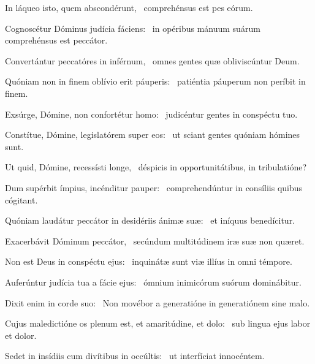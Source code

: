 \item In láqueo isto, quem abscondérunt,~\psstar{} comprehénsus est pes eórum.

\item Cognoscétur Dóminus judícia fáciens:~\psstar{} in opéribus mánuum suárum comprehénsus est peccátor.

\item Convertántur peccatóres in inférnum,~\psstar{} omnes gentes quæ obliviscúntur Deum.

\item Quóniam non in finem oblívio erit páuperis:~\psstar{} patiéntia páuperum non períbit in finem.

\item Exsúrge, Dómine, non confortétur homo:~\psstar{} judicéntur gentes in conspéctu tuo.

\item Constítue, Dómine, legislatórem super eos:~\psstar{} ut sciant gentes quóniam hómines sunt.

\item Ut quid, Dómine, recessísti longe,~\psstar{} déspicis in opportunitátibus, in tribulatióne?

\item Dum supérbit ímpius, incénditur pauper:~\psstar{} comprehendúntur in consíliis quibus cógitant.

\item Quóniam laudátur peccátor in desidériis ánimæ suæ:~\psstar{} et iníquus benedícitur.

\item Exacerbávit Dóminum peccátor,~\psstar{} secúndum multitúdinem iræ suæ non quæret.

\item Non est Deus in conspéctu ejus:~\psstar{} inquinátæ sunt viæ illíus in omni témpore.

\item Auferúntur judícia tua a fácie ejus:~\psstar{} ómnium inimicórum suórum dominábitur.

\item Dixit enim in corde suo:~\psstar{} Non movébor a generatióne in generatiónem sine malo.

\item Cujus maledictióne os plenum est, et amaritúdine, et dolo:~\psstar{} sub lingua ejus labor et dolor.

\item Sedet in insídiis cum divítibus in occúltis:~\psstar{} ut interfíciat innocéntem.

